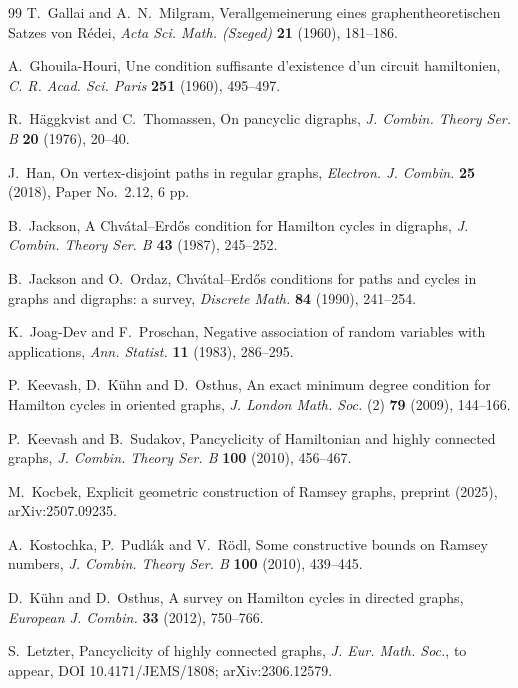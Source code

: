 \documentclass[11pt,a4paper]{article}
\theoremstyle{remark}
\numberwithin{equation}{section}
\begin{document}
\begin{thebibliography}{99}
		T.~Gallai and A.~N.~Milgram,
		Verallgemeinerung eines graphentheoretischen Satzes von R\'edei,
		\emph{Acta Sci. Math. (Szeged)} \textbf{21} (1960), 181--186.
		
		A.~Ghouila-Houri,
		Une condition suffisante d'existence d'un circuit hamiltonien,
		\emph{C. R. Acad. Sci. Paris} \textbf{251} (1960), 495--497.
		
		R.~H\"aggkvist and C.~Thomassen,
		On pancyclic digraphs,
		\emph{J. Combin. Theory Ser. B} \textbf{20} (1976), 20--40.
		
		J.~Han,
		On vertex-disjoint paths in regular graphs,
		\emph{Electron. J. Combin.} \textbf{25} (2018), Paper No.~2.12, 6 pp.
		
		B.~Jackson,
		A Chv\'atal--Erd\H{o}s condition for Hamilton cycles in digraphs,
		\emph{J. Combin. Theory Ser. B} \textbf{43} (1987), 245--252.
		
		B.~Jackson and O.~Ordaz,
		Chv\'atal--Erd\H{o}s conditions for paths and cycles in graphs and digraphs:
		a survey, \emph{Discrete Math.} \textbf{84} (1990), 241--254.
		
		K.~Joag-Dev and F.~Proschan,
		Negative association of random variables with applications,
		\emph{Ann. Statist.} \textbf{11} (1983), 286--295.
		
		P.~Keevash, D.~K\"uhn and D.~Osthus,
		An exact minimum degree condition for Hamilton cycles in oriented graphs,
		\emph{J. London Math. Soc.} (2) \textbf{79} (2009), 144--166.
		
		P.~Keevash and B.~Sudakov,
		Pancyclicity of Hamiltonian and highly connected graphs,
		\emph{J. Combin. Theory Ser. B} \textbf{100} (2010), 456--467.
		
		M.~Kocbek,
		Explicit geometric construction of Ramsey graphs,
		preprint (2025), arXiv:2507.09235.
		
		A.~Kostochka, P.~Pudl\'ak and V.~R\"odl,
		Some constructive bounds on Ramsey numbers,
		\emph{J. Combin. Theory Ser. B} \textbf{100} (2010), 439--445.
			
		D.~K\"uhn and D.~Osthus,
		A survey on Hamilton cycles in directed graphs,
		\emph{European J. Combin.} \textbf{33} (2012), 750--766.
				
		S.~Letzter,
		Pancyclicity of highly connected graphs,
		\emph{J. Eur. Math. Soc.}, to appear,
		DOI 10.4171/JEMS/1808; arXiv:2306.12579.
							

\end{thebibliography}
\end{document}
